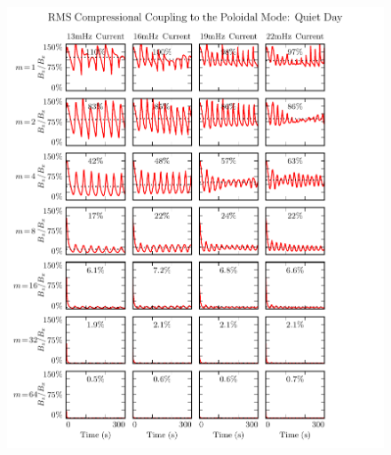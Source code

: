 \begin{figure}[!htb]
    \centering
    \includegraphics[width=\textwidth]{figures/comp_2.pdf}
    \caption[Compressional Coupling to the Poloidal Mode: Quiet Day]{
      \todo{$\cdots$}
    }
    \label{fig_comp_2}
\end{figure}

